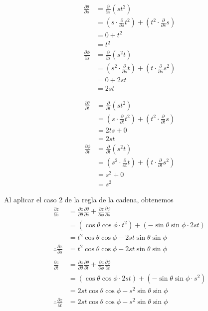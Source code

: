 \documentclass[12pt]{article}
\begin{document}
\begin{align*}
  \frac{\partial \theta}{\partial s}
  &= \frac{\partial}{\partial s}( st^2) \\
  &= \left(s\cdot\frac{\partial}{\partial s} t^2\right) + \left(t^2\cdot\frac{\partial}{\partial s}s\right) \\
  &= 0 + t^2 \\
  &= t^2 \\
  \frac{\partial \phi}{\partial s}
  &= \frac{\partial}{\partial s} (s^2t) \\
  &= \left(s^2\cdot\frac{\partial}{\partial s}t\right)+\left(t\cdot\frac{\partial}{\partial s}s^2\right) \\
  &= 0 + 2st \\
  &= 2st
\end{align*}

\begin{align*}
  \frac{\partial \theta}{\partial t}
  &= \frac{\partial}{\partial t}( st^2) \\
  &= \left(s\cdot\frac{\partial}{\partial t}t^2\right) +\left(t^2\cdot\frac{\partial}{\partial t}s\right) \\
  &= 2ts + 0 \\
  &= 2st\\
  \frac{\partial \phi}{\partial t}
  &= \frac{\partial}{\partial t}( s^2t )\\
  &= \left(s^2\cdot\frac{\partial}{\partial t}t\right) + \left(t\cdot\frac{\partial}{\partial t}s^2\right) \\
  &= s^2 + 0 \\
  &= s^2
\end{align*}

Al aplicar el caso 2 de la regla de la cadena, obtenemos
\begin{align*}
  \frac{\partial z}{\partial s}
  &= \frac{\partial z}{\partial \theta}\frac{\partial \theta}{\partial s} + \frac{\partial z}{\partial \phi}\frac{\partial \phi}{\partial s} \\
  &=  (\cos{\theta}\cos{\phi} \cdot t^2) + (-\sin{\theta}\sin{\phi} \cdot 2st) \\
  &= t^2\cos{\theta}\cos{\phi} - 2st\sin{\theta}\sin{\phi} \\
  \therefore \frac{\partial z}{\partial s}
  &= t^2\cos{\theta}\cos{\phi} - 2st\sin{\theta}\sin{\phi} \\ \\
  \frac{\partial z}{\partial t}
  &= \frac{\partial z}{\partial \theta}\frac{\partial \theta}{\partial t} + \frac{\partial z}{\partial \phi}\frac{\partial \phi}{\partial t} \\
  &=  (\cos{\theta}\cos{\phi} \cdot 2st) + (-\sin{\theta}\sin{\phi} \cdot s^2) \\
  &= 2st\cos{\theta}\cos{\phi} - s^2\sin{\theta}\sin{\phi} \\
  \therefore \frac{\partial z}{\partial t}
  &= 2st\cos{\theta}\cos{\phi} - s^2\sin{\theta}\sin{\phi} 
\end{align*}
\end{document}
